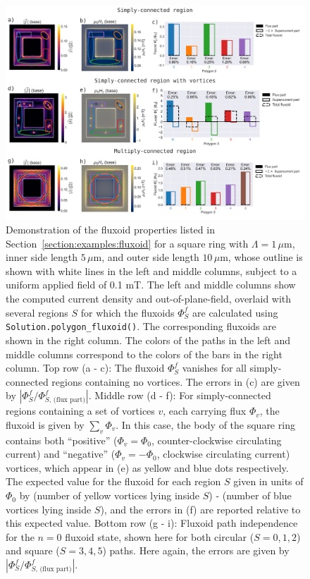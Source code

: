 \documentclass[final,3p,times]{elsarticle}
\newcommand{\inline}[1]{\texttt{#1}\xspace}
\begin{document}
\begin{figure}
    \centering
    \includegraphics[width=\textwidth]{examples/images/fluxoid_combined.png}
    \caption{Demonstration of the fluxoid properties listed in Section~\ref{section:examples:fluxoid} for a square ring with $\Lambda=1\,\mu\mathrm{m}$, inner side length $5\,\mu\mathrm{m}$, and outer side length $10\,\mu\mathrm{m}$, whose outline is shown with white lines in the left and middle columns, subject to a uniform applied field of 0.1 mT. The left and middle columns show the computed current density and out-of-plane-field, overlaid with several regions $S$ for which the fluxoids $\Phi^f_S$ are calculated using \inline{Solution.polygon_fluxoid()}. The corresponding fluxoids are shown in the right column. The colors of the paths in the left and middle columns correspond to the colors of the bars in the right column. Top row (a - c): The fluxoid $\Phi^f_S$ vanishes for all simply-connected regions containing no vortices. The errors in (c) are given by $|\Phi^f_S / \Phi^f_{S,\,\text{(flux part)}}|$. Middle row (d - f): For simply-connected regions containing a set of vortices $v$, each carrying flux $\Phi_v$, the fluxoid is given by $\sum_v\Phi_v$. In this case, the body of the square ring contains both ``positive'' ($\Phi_v=\Phi_0$, counter-clockwise circulating current) and ``negative'' ($\Phi_v=-\Phi_0$, clockwise circulating current) vortices, which appear in (e) as yellow and blue dots respectively. The expected value for the fluxoid for each region $S$ given in units of $\Phi_0$ by (number of yellow vortices lying inside $S$) - (number of blue vortices lying inside $S$), and the errors in (f) are reported relative to this expected value. Bottom row (g - i): Fluxoid path independence for the $n=0$ fluxoid state, shown here for both circular ($S = 0, 1, 2$) and square ($S=3, 4, 5$) paths. Here again, the errors are given by $|\Phi^f_S / \Phi^f_{S,\,\text{(flux part)}}|$.}
    \label{fig:fluxoid}
\end{figure}
\end{document}
